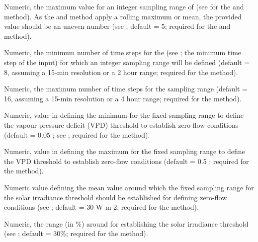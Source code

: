 \documentclass[a4paper]{book}
\begin{document}
\begin{Arguments}
\begin{ldescription}
\item[\code{max.days\_max}] Numeric, the maximum value for an integer sampling range of 
(see  for the  and   method).
As the  and  method apply a rolling maximum or mean, the provided value should be an
uneven number (see ; default = 5; required for the  and   method).

\item[\code{ed.window\_min}] Numeric, the minimum number of time steps for the  (see ; the minimum time step of the input)
for which an integer sampling range will be defined (default = 8, assuming a 15-min resolution or a 2 hour range; required for the   method).

\item[\code{ed.window\_max}] Numeric, the maximum number of time steps for the  sampling range
(default = 16, assuming a 15-min resolution or a 4 hour range; required for the   method).

\item[\code{criteria.vpd\_min}] Numeric, value in  defining the minimum for the fixed sampling range to define the vapour pressure deficit (VPD)
threshold to establish zero-flow conditions (default = 0.05 ; see ; required for the   method).

\item[\code{criteria.vpd\_max}] Numeric, value in  defining the maximum for the fixed sampling range to define the VPD threshold to establish
zero-flow conditions (default = 0.5 ; required for the    method).

\item[\code{criteria.sr\_mean}] Numeric value defining the mean  value around which the fixed sampling
range for the solar irradiance threshold should be established for defining zero-flow conditions
(see ; default = 30 W m-2; required for the   method).

\item[\code{criteria.sr\_range}] Numeric, the range (in \%) around  for establishing the solar irradiance threshold
(see ; default = 30\%; required for the   method).


\end{ldescription}
\end{Arguments}
\end{document}

